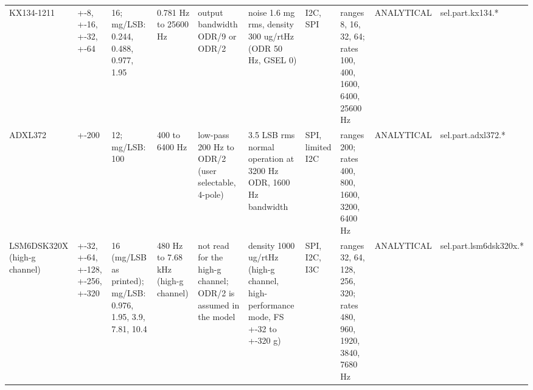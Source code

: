 \begin{table}[t]
\begin{tabular}{llllllllll}
KX134-1211 & +-8, +-16, +-32, +-64 & 16; mg/LSB: 0.244, 0.488, 0.977, 1.95 & 0.781 Hz to 25600 Hz & output bandwidth ODR/9 or ODR/2 & noise 1.6 mg rms, density 300 ug/rtHz (ODR 50 Hz, GSEL 0) & I2C, SPI & ranges 8, 16, 32, 64; rates 100, 400, 1600, 6400, 25600 Hz & ANALYTICAL & sel.part.kx134.* \\
ADXL372 & +-200 & 12; mg/LSB: 100 & 400 to 6400 Hz & low-pass 200 Hz to ODR/2 (user selectable, 4-pole) & 3.5 LSB rms normal operation at 3200 Hz ODR, 1600 Hz bandwidth & SPI, limited I2C & ranges 200; rates 400, 800, 1600, 3200, 6400 Hz & ANALYTICAL & sel.part.adxl372.* \\
LSM6DSK320X (high-g channel) & +-32, +-64, +-128, +-256, +-320 & 16 (mg/LSB as printed); mg/LSB: 0.976, 1.95, 3.9, 7.81, 10.4 & 480 Hz to 7.68 kHz (high-g channel) & not read for the high-g channel; ODR/2 is assumed in the model & density 1000 ug/rtHz (high-g channel, high-performance mode, FS +-32 to +-320 g) & SPI, I2C, I3C & ranges 32, 64, 128, 256, 320; rates 480, 960, 1920, 3840, 7680 Hz & ANALYTICAL & sel.part.lsm6dsk320x.* \\
\bottomrule
\end{tabular}
\end{table}
